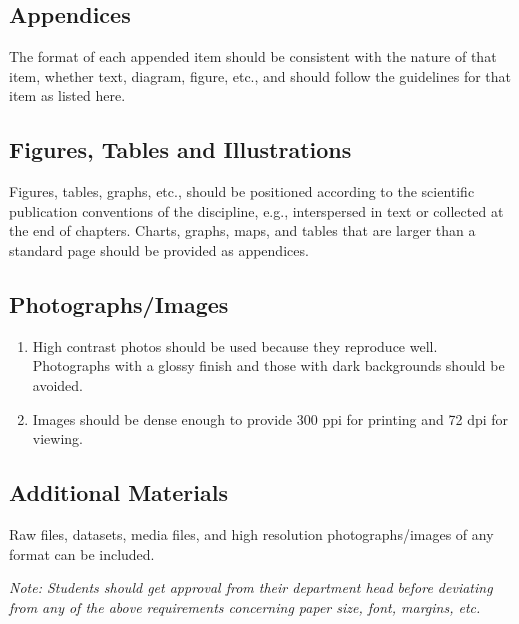 \subsection{Appendices}

The format of each appended item should be consistent with the nature of that item, whether text, diagram, figure, etc., and should follow the guidelines for that item as listed here.

\subsection{Figures, Tables and Illustrations}

Figures, tables, graphs, etc., should be positioned according to the scientific publication conventions of the discipline, e.g., interspersed in text or collected at the end of chapters. Charts, graphs, maps, and tables that are larger than a standard page should be provided as appendices.

\subsection{Photographs/Images}

\begin{enumerate}
  \item High contrast photos should be used because they reproduce well. Photographs with a glossy finish and those with dark backgrounds should be avoided.
  \item Images should be dense enough to provide 300 ppi for printing and 72 dpi for viewing.
\end{enumerate}

\subsection{Additional Materials}

Raw files, datasets, media files, and high resolution photographs/images of any format can be included.

\emph{Note: Students should get approval from their department head before deviating from any of the above requirements concerning paper size, font, margins, etc. }
